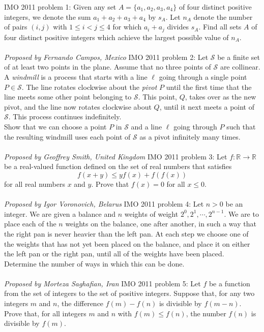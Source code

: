IMO 2011 problem 1:  Given any set $A = \{a_1, a_2, a_3, a_4\}$ of four distinct positive integers, we denote the sum $a_1 +a_2 +a_3 +a_4$ by $s_A$. Let $n_A$ denote the number of pairs $(i, j)$ with $1 \leq  i < j \leq 4$ for which $a_i +a_j$ divides $s_A$. Find all sets $A$ of four distinct positive integers which achieve the largest possible value of $n_A$. \\\\
\textit{Proposed by Fernando Campos, Mexico} 
IMO 2011 problem 2:  Let $\mathcal{S}$ be a finite set of at least two points in the plane. Assume that no three points of $\mathcal S$ are collinear. A \textit{windmill} is a process that starts with a line $\ell$ going through a single point $P \in \mathcal S$. The line rotates clockwise about the \textit{pivot} $P$ until the first time that the line meets some other point belonging to $\mathcal S$. This point, $Q$, takes over as the new pivot, and the line now rotates clockwise about $Q$, until it next meets a point of $\mathcal S$. This process continues indefinitely. \\
Show that we can choose a point $P$ in $\mathcal S$ and a line $\ell$ going through $P$ such that the resulting windmill uses each point of $\mathcal S$ as a pivot infinitely many times. \\\\
\textit{Proposed by Geoffrey Smith, United Kingdom} 
IMO 2011 problem 3:  Let $f : \mathbb R \to \mathbb R$ be a real-valued function defined on the set of real numbers that satisfies
\[ f(x + y) \leq yf(x) + f(f(x)) \]
for all real numbers $x$ and $y$. Prove that $f(x) = 0$ for all $x \leq 0$. \\\\
\textit{Proposed by Igor Voronovich, Belarus} 
IMO 2011 problem 4:  Let $n > 0$ be an integer. We are given a balance and $n$ weights of weight $2^0, 2^1, \cdots, 2^{n-1}$. We are to place each of the $n$ weights on the balance, one after another, in such a way that the right pan is never heavier than the left pan. At each step we choose one of the weights that has not yet been placed on the balance, and place it on either the left pan or the right pan, until all of the weights have been placed. \\
Determine the number of ways in which this can be done. \\\\
\textit{Proposed by Morteza Saghafian, Iran} 
IMO 2011 problem 5:  Let $f$ be a function from the set of integers to the set of positive integers. Suppose that, for any two integers $m$ and $n$, the difference $f(m) - f(n)$ is divisible by $f(m- n)$. Prove that, for all integers $m$ and $n$ with $f(m) \leq f(n)$, the number $f(n)$ is divisible by $f(m)$. \\\\
